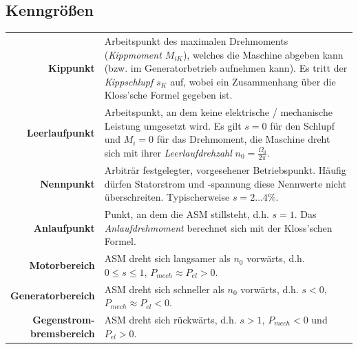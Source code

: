 \documentclass[11pt]{article}
\begin{document}
\subsection*{Kenngrößen}
\begin{center}
\bgroup
\begin{longtable}{r p{12cm}}
	\textbf{Kippunkt} & Arbeitspunkt des maximalen Drehmoments (\textit{Kippmoment $M_{iK}$}), welches die Maschine abgeben kann (bzw. im Generatorbetrieb aufnehmen kann). Es tritt der \textit{Kippschlupf} $s_K$ auf, wobei ein Zusammenhang über die Kloss'sche Formel gegeben ist. \\
	\textbf{Leerlaufpunkt} & Arbeitspunkt, an dem keine elektrische / mechanische Leistung umgesetzt wird. Es gilt $s = 0$ für den Schlupf und $M_i = 0$ für das Drehmoment, die Maschine dreht sich mit ihrer \textit{Leerlaufdrehzahl} $n_0 = \frac{\Omega_0}{2\pi}$. \\
	\textbf{Nennpunkt} & Arbiträr festgelegter, vorgesehener Betriebspunkt. Häufig dürfen Statorstrom und -spannung diese Nennwerte nicht überschreiten. Typischerweise $s = 2\dots4\%$. \\
	\textbf{Anlaufpunkt} & Punkt, an dem die ASM stillsteht, d.h. $s = 1$. Das \textit{Anlaufdrehmoment} berechnet sich mit der Kloss'schen Formel. \\
	\textbf{Motorbereich} & ASM dreht sich langsamer als $n_0$ vorwärts, d.h. $0 \leq s \leq 1$, $P_{mech} \approx P_{el} > 0$. \\
	\textbf{Generatorbereich} & ASM dreht sich schneller als $n_0$ vorwärts, d.h. $s < 0$, $P_{mech} \approx P_{el} < 0$. \\
	\pbox{20cm}{\textbf{Gegenstrom-} \\ \textbf{bremsbereich}} & ASM dreht sich rückwärts, d.h. $s > 1$, $P_{mech} < 0$ und $P_{el} > 0$.
\end{longtable}
\egroup
\end{center}
\end{document}
